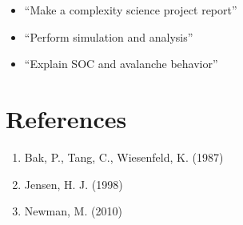 \documentclass[12pt,a4paper]{article}
\begin{document}
\begin{itemize}
\item ``Make a complexity science project report''
\item ``Perform simulation and analysis''
\item ``Explain SOC and avalanche behavior''
\end{itemize}

\section{References}

\begin{enumerate}
\item Bak, P., Tang, C., Wiesenfeld, K. (1987)
\item Jensen, H. J. (1998)
\item Newman, M. (2010)
\end{enumerate}
\end{document}
